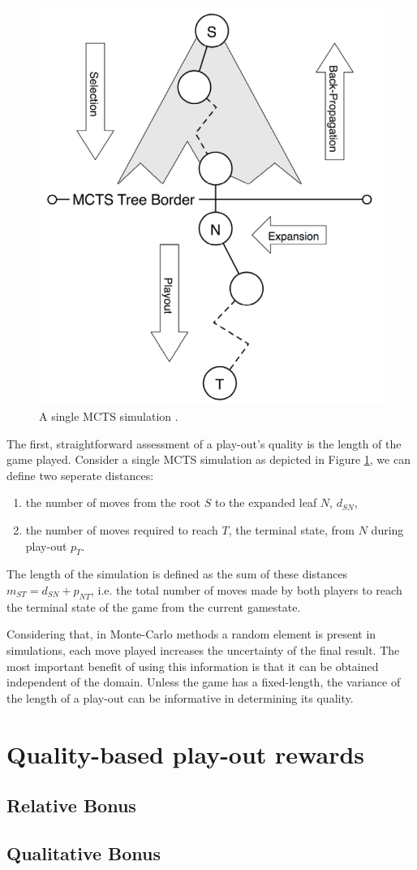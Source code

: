 \documentclass{ecai2010}
\begin{document}
\begin{figure}[ht]
	\centering
	\includegraphics[width=.3\textwidth]{img/figure2.png}
	\caption{A single MCTS simulation \cite{finnsson2010learning}.}
	\label{fig:mcts-simulation}
\end{figure}

The first, straightforward assessment of a play-out's quality is the length of the game played. Consider a single MCTS simulation as depicted in Figure \ref{fig:mcts-simulation}, we can define two seperate distances: 
\begin{enumerate}
\item the number of moves from the root $S$ to the expanded leaf $N$, $d_{SN}$,
\item the number of moves required to reach $T$, the terminal state, from $N$ during play-out $p_T$.
\end{enumerate}
The length of the simulation is defined as the sum of these distances $m_{ST} = d_{SN} + p_{NT}$, i.e. the total number of moves made by both players to reach the terminal state of the game from the current gamestate.

Considering that, in Monte-Carlo methods a random element is present in simulations, each move played increases the uncertainty of the final result. The most important benefit of using this information is that it can be obtained independent of the domain. Unless the game has a fixed-length, the variance of the length of a play-out can be informative in determining its quality.

\section{Quality-based play-out rewards}
\subsection{Relative Bonus}
\subsection{Qualitative Bonus}
\end{document}
